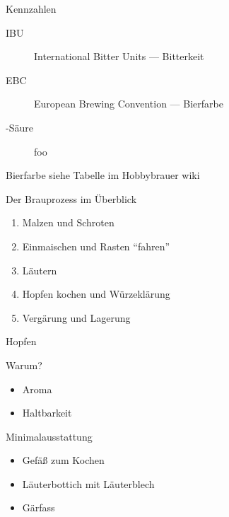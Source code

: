 \documentclass[18pt]{beamer}
\begin{document}
\begin{frame}{Kennzahlen}
  \begin{description}
    \item[IBU] International Bitter Units --- Bitterkeit
    \item[EBC] European Brewing Convention --- Bierfarbe
    \item[\textalpha-Säure]  foo
  \end{description}
\end{frame}
\begin{frame}{Bierfarbe}
  siehe Tabelle im Hobbybrauer wiki
\end{frame}
\begin{frame}{Der Brauprozess im Überblick}
  \begin{enumerate}
    \item Malzen und Schroten
    \item Einmaischen und Rasten \enquote{fahren}
    \item Läutern
    \item Hopfen kochen und Würzeklärung
    \item Vergärung und Lagerung
  \end{enumerate}
\end{frame}
\begin{frame}{Hopfen}
  \begin{block}{Warum?}
    \begin{itemize}
      \item Aroma
      \item Haltbarkeit
    \end{itemize}
  \end{block}
\end{frame}
\begin{frame}{Minimalausstattung}
  \begin{itemize}
    \item Gefäß zum Kochen
    \item Läuterbottich mit Läuterblech
    \item Gärfass
  \end{itemize}
\end{frame}
\end{document}
